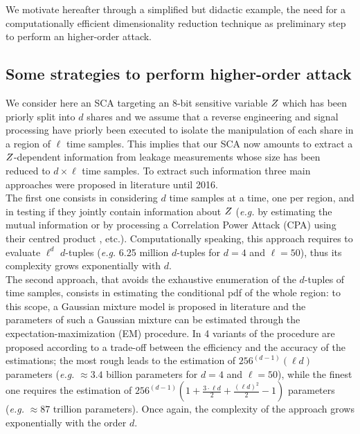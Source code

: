 We motivate hereafter through a simplified but didactic  example, the need for a computationally efficient dimensionality reduction technique as preliminary step to perform an higher-order attack.


\subsection{Some strategies to perform higher-order attack}\label{sec:example}
We consider here an SCA targeting an $8$-bit sensitive variable $Z$ which has been priorly split into $d$ shares and we assume that a reverse engineering and signal processing have priorly been executed to isolate the manipulation of each share  in a region of $\ell$ time samples. This implies that our SCA  now amounts to extract a $Z$-dependent information from leakage measurements whose size has been reduced to $d\times \ell$ time samples. To extract such information three main approaches were proposed in literature until 2016.\\

The first one consists in considering $d$ time samples  at a time, one per region, and in testing if they jointly contain information about $Z$ (\emph{e.g.} by estimating the mutual information  \cite{Reparaz2012} or by processing a Correlation Power Attack (CPA) using their centred product \cite{chari1999towards}, etc.). Computationally speaking, this approach requires to evaluate $\ell^d$ $d$-tuples (\emph{e.g.} 6.25 million $d$-tuples for $d=4$ and $\ell=50$), thus its complexity grows exponentially with $d$. \\

The second approach, that avoids the exhaustive enumeration of the $d$-tuples of time samples, consists in estimating the conditional pdf of the whole region: 
to this scope, a Gaussian mixture model is proposed in literature \cite{lemke2007gaussian,Lomne2014} and the parameters of such a Gaussian mixture can be estimated through the expectation-maximization (EM) procedure. In \cite{lemke2007gaussian} 4 variants of the procedure are proposed according to a trade-off between the efficiency and the accuracy of the estimations;  the most rough leads to the estimation of  $256^{(d-1)}(\ell d)$  parameters (\emph{e.g.} $\approx 3.4 $ billion parameters for $d=4$ and $\ell=50$), while the finest one requires the estimation of $256^{(d-1)}(1 + \frac{3\cdot \ell d}{2} + \frac{(\ell d)^2}{2}-1)$ parameters (\emph{e.g.} $\approx 87$ trillion parameters). Once again, the complexity of the approach grows exponentially with the order $d$.\\

